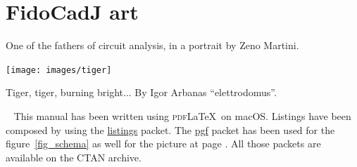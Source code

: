 \documentclass[10pt,a4paper,twoside]{scrreprt}
\begin{document}
\chapter{FidoCadJ art} \label{chap_fidocadj_art}

\noindent
\resizebox{\textwidth}{!}{}
\label{steinmetz}
One of the fathers of circuit analysis, in a portrait by Zeno Martini.

\noindent
\texttt{[image: images/tiger]}
\begin{center}
Tiger, tiger, burning bright... By Igor Arbanas ``elettrodomus''.
\end{center}

\printindex
\cleardoublepage
\thispagestyle{empty}
\mbox{ }
\vfill
This manual has been written using \textsc{pdf}\LaTeX\ on macOS.
Listings have been composed by using the  \href{http://www.ctan.org/tex-archive/macros/latex/contrib/listings/}{listings} packet. The \href{http://www.ctan.org/tex-archive/graphics/pgf/}{pgf} packet has been used for the figure~\ref{fig_schema} as well for the picture at page \pageref{steinmetz}. All those packets are available on the CTAN archive.

\end{document}
